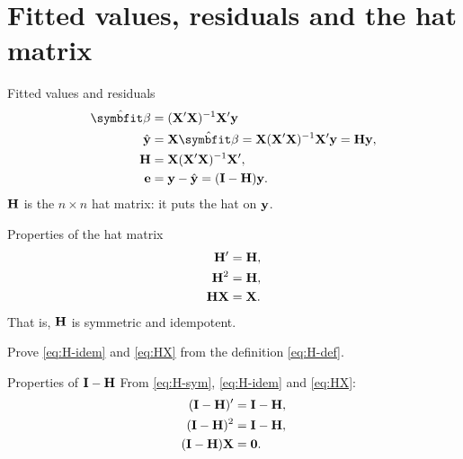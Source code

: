 \section{Fitted values, residuals and the hat matrix}


\begin{frame}{Fitted values and residuals}
    \begin{align}
        \hat{\bbeta} &= (\bX'\bX)^{-1}\bX' \by \notag\\ 
        \hat{\by} &= \bX\hat{\bbeta} = \bX (\bX'\bX)^{-1}\bX' \by = \bH\by, \notag\\
        \bH &= \bX(\bX'\bX)^{-1}\bX', \label{eq:H-def}\\
        \be &= \by - \hat{\by} = (\bI-\bH)\by. \label{eq:resid}
    \end{align}
    $\mathbf{H}$ is the $n\times n$ hat matrix: it puts the hat on $\mathbf{y}$.
\end{frame}


\begin{frame}{Properties of the hat matrix}
    \begin{align}
        \mathbf{H}' &= \mathbf{H}, \label{eq:H-sym}\\
        \mathbf{H}^2 &= \mathbf{H}, \label{eq:H-idem}\\
        \mathbf{H}\mathbf{X} &= \mathbf{X}. \label{eq:HX}
    \end{align}
    That is, $\mathbf{H}$ is symmetric and idempotent.

    \svspace{1em}

    Prove \eqref{eq:H-idem} and \eqref{eq:HX} from the definition \eqref{eq:H-def}.

\end{frame}


\begin{frame}{Properties of $\mathbf{I}-\mathbf{H}$}
    From \eqref{eq:H-sym}, \eqref{eq:H-idem} and \eqref{eq:HX}:
    \begin{align}
        (\mathbf{I}-\mathbf{H})' &= \mathbf{I}-\mathbf{H}, \label{eq:IH-sym}\\
        (\mathbf{I}-\mathbf{H})^2 &= \mathbf{I}-\mathbf{H}, \label{eq:IH-idem}\\
        (\mathbf{I}-\mathbf{H})\mathbf{X} &= \mathbf{0}. \label{eq:IHX}
    \end{align}
\end{frame}


